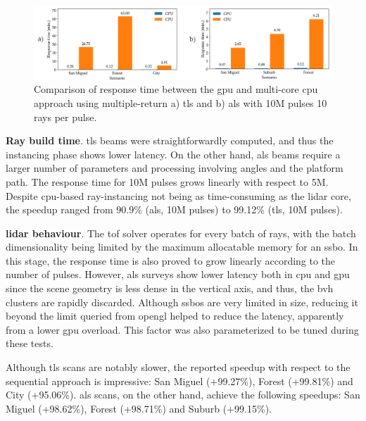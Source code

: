 \begin{figure} [ht]
	\centering
	\includegraphics[width=\linewidth]{figs/lidar_simulation/response_time.png}
	\caption{Comparison of response time between the \acrshort{gpu} and multi-core \acrshort{cpu} approach using multiple-return a) \acrshort{tls} and b) \acrshort{als} with 10M pulses 10 rays per pulse. }
	\label{fig:lidar_response_time_global}
\end{figure}

\textbf{Ray build time}. \acrshort{tls} beams were straightforwardly computed, and thus the instancing phase shows lower latency. On the other hand, \acrshort{als} beams require a larger number of parameters and processing involving angles and the platform path. The response time for 10M pulses grows linearly with respect to 5M. Despite \acrshort{cpu}-based ray-instancing not being as time-consuming as the \acrshort{lidar} core, the speedup ranged from 90.9\% (\acrshort{als}, 10M pulses) to 99.12\% (\acrshort{tls}, 10M pulses).

\textbf{\acrshort{lidar} behaviour}. The \acrshort{tof} solver operates for every batch of rays, with the batch dimensionality being limited by the maximum allocatable memory for an \acrshort{ssbo}. In this stage, the response time is also proved to grow linearly according to the number of pulses. However, \acrshort{als} surveys show lower latency both in \acrshort{cpu} and \acrshort{gpu} since the scene geometry is less dense in the vertical axis, and thus, the \acrshort{bvh} clusters are rapidly discarded. Although \acrshort{ssbo}s are very limited in size, reducing it beyond the limit queried from \acrshort{opengl} helped to reduce the latency, apparently from a lower \acrshort{gpu} overload. This factor was also parameterized to be tuned during these tests.

Although \acrshort{tls} scans are notably slower, the reported speedup with respect to the sequential approach is impressive: San Miguel (+99.27\%), Forest (+99.81\%) and City (+95.06\%). \acrshort{als} scans, on the other hand, achieve the following speedups: San Miguel (+98.62\%), Forest (+98.71\%) and Suburb (+99.15\%).

